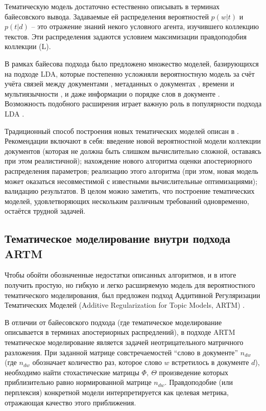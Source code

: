Тематическую модель достаточно естественно описывать в терминах байесовского вывода.  Задаваемые ей распределения вероятностей $p(w|t)$ и $p(t|d)$ – это отражение знаний некого условного агента, изучившего коллекцию текстов. Эти распределения задаются условием максимизации правдоподобия коллекции (L). 

В рамках байесова подхода было предложено множество моделей, базирующихся на подходе LDA, которые постепенно усложняли вероятностную модель за счёт учёта связей между документами \cite{cohn2001missing,mccallum2005author,nallapati2008link}, метаданных о документах \cite{steyvers2004probabilistic}, 
времени и мультиязычности \cite{zosa-granroth-wilding-2019-multilingual}, и даже информации о порядке слов в документе \cite{gruber2007hidden,wallach2006topic}. Возможность подобного расширения играет важную роль в популярности подхода LDA \cite{fntir2017applications}.

Традиционный способ построения новых тематических моделей описан в  \cite{fntir2017applications}. Рекомендации включают в себя: введение новой вероятностной модели коллекции документов (которая не должна быть слишком вычислительно сложной, оставаясь при этом реалистичной); нахождение нового алгоритма оценки апостериорного распределения параметров; реализацию этого алгоритма (при этом, новая модель может оказаться несовместимой с известными вычислительные оптимизациями); валидацию результатов. В целом можно заметить, что построение тематических моделей, удовлетворяющих нескольким различным требований одновременно, остаётся трудной задачей.

\subsection{Тематическое моделирование внутри подхода ARTM}

Чтобы обойти обозначенные недостатки описанных алгоритмов, и в итоге получить простую, но гибкую и легко расширяемую модель для вероятностного тематического моделирования, был предложен подход Аддитивной Регуляризации Тематических Моделей (Additive Regularization for Topic Models, ARTM) \cite{vorontsov2014additive,vorontsov2014tutorial,vorontsov2015additive}. 

В отличии от байесовского подхода (где тематическое моделирование описывается в терминах апостериорных распредлений), в подходе ARTM тематическое моделирование является задачей неотрицательного матричного разложения. При заданной матрице совстречаемостей ``слово в документе''  $n_{dw}$ (где $n_{dw}$ обозначает количество раз, которое слово  $w$ встретилось в документе $d$), необходимо найти стохастические матрицы $\Phi,~\Theta$ произведение которых приблизительно равно нормированной матрице $n_{dw}$. Правдоподобие (или перплексия) конкретной модели интерпретируется как целевая метрика, отражающая качество этого приближения.

